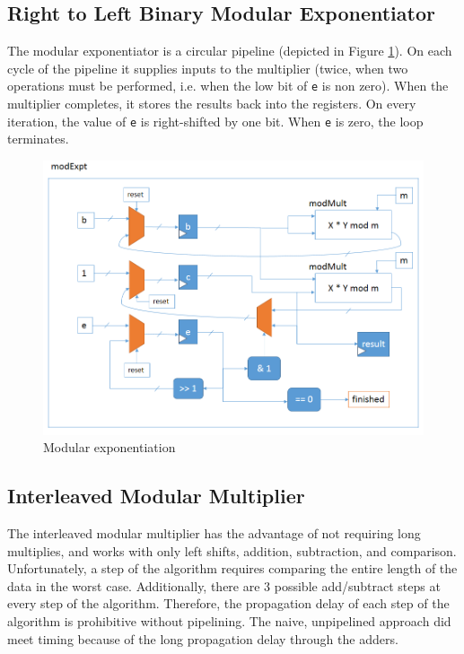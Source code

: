 \documentclass[a4paper,11pt]{report}
\begin{document}
\subsection{Right to Left Binary Modular Exponentiator}
The modular exponentiator is a circular pipeline (depicted in Figure \ref{fig-expt}).
On each cycle of the pipeline it supplies inputs to the multiplier (twice, when two operations must be performed, i.e. when the low bit of {\tt e} is non zero).
When the multiplier completes, it stores the results back into the registers.
On every iteration, the value of {\tt e} is right-shifted by one bit.
When {\tt e} is zero, the loop terminates.

\begin{figure}
  \begin{centering}
    \includegraphics[width=\textwidth]{modexpt.png}
    \caption{Modular exponentiation}
    \label{fig-expt}
  \end{centering}
\end{figure}

\subsection{Interleaved Modular Multiplier}
The interleaved modular multiplier has the advantage of not requiring long multiplies, and works with
only left shifts, addition, subtraction, and comparison. Unfortunately, a step of the 
algorithm requires comparing the entire length of the data in the worst case. Additionally,
there are 3 possible add/subtract steps at every step of the algorithm. Therefore, the propagation delay
of each step of the algorithm is prohibitive without pipelining. The naive, unpipelined approach did 
meet timing because of the long propagation delay through the adders.
\end{document}
